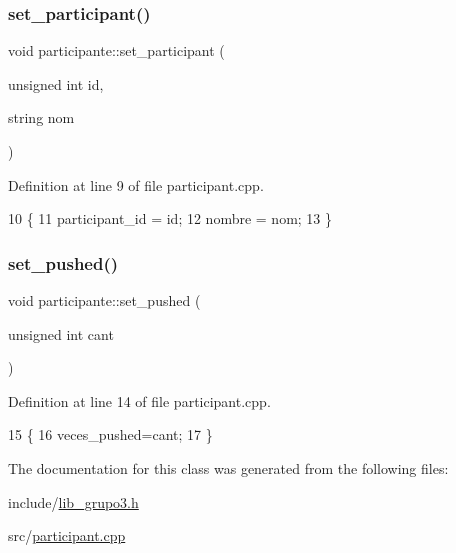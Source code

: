 \subsubsection{\texorpdfstring{set\+\_\+participant()}{set\_participant()}}
{\footnotesize\ttfamily void participante\+::set\+\_\+participant (\begin{DoxyParamCaption}\item[{unsigned int}]{id,  }\item[{string}]{nom }\end{DoxyParamCaption})}



Definition at line 9 of file participant.\+cpp.


\begin{DoxyCode}
10 \{
11         participant\_id = id;
12         nombre = nom;
13 \}
\end{DoxyCode}
\mbox{\label{classparticipante_afcfca6704c1dfac469f5908b683238bc}} 
\subsubsection{\texorpdfstring{set\+\_\+pushed()}{set\_pushed()}}
{\footnotesize\ttfamily void participante\+::set\+\_\+pushed (\begin{DoxyParamCaption}\item[{unsigned int}]{cant }\end{DoxyParamCaption})}



Definition at line 14 of file participant.\+cpp.


\begin{DoxyCode}
15 \{
16         veces\_pushed=cant;
17 \}
\end{DoxyCode}


The documentation for this class was generated from the following files\+:\begin{DoxyCompactItemize}
\item 
include/\hyperlink{lib__grupo3_8h}{lib\+\_\+grupo3.\+h}\item 
src/\hyperlink{participant_8cpp}{participant.\+cpp}\end{DoxyCompactItemize}
